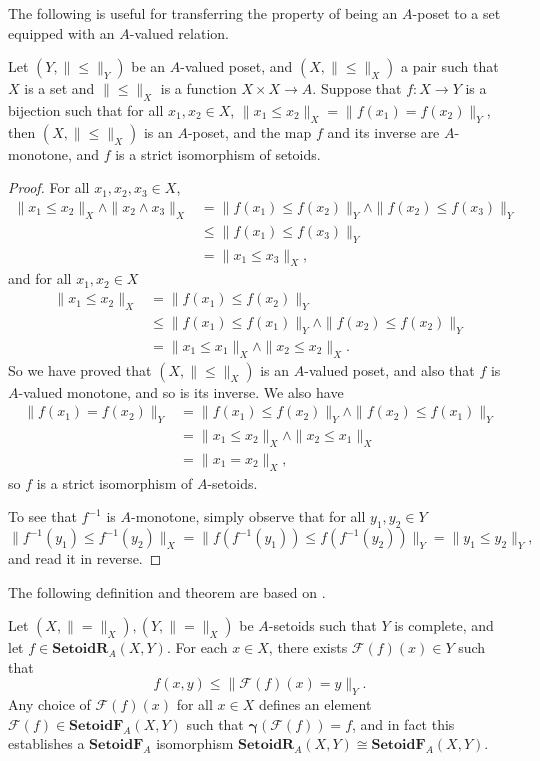 \documentclass{lmcs}
\newcommand{\cat}[1]{\ensuremath{\mathbf{#1}}}
\newcommand{\beq}{\|\mbox{$=$}\|}
\newcommand{\bleq}{\|\mbox{$\leq$}\|}
\newcommand{\graph}{\pmb{\gamma}}
\newcommand{\ungraph}{\pmb{\mathcal{F}}}
\newcommand{\SetoidR}{\cat{SetoidR}}
\newcommand{\SetoidF}{\cat{SetoidF}}
\newcommand{\bvs}[1]{\| {#1} \|}
\begin{document}
The following is useful for transferring the property of being an $A$-poset to a set equipped with an $A$-valued relation.
\begin{lem}
\label{BuildPosetByIsoLemma}
Let $(Y,\bleq_Y)$ be an $A$-valued poset, and $(X,\bleq_X)$ a pair such that $X$ is a set and $\bleq_X$ is a function $X \times X \rightarrow A$. Suppose that $f : X \rightarrow Y$ is a bijection such that for all $x_1,x_2 \in X$, $\bvs{x_1 \leq x_2}_X = \bvs{f(x_1) = f(x_2)}_Y$, then $(X,\bleq_X)$ is an $A$-poset, and the map $f$ and its inverse are $A$-monotone, and $f$ is a strict isomorphism of setoids.
\end{lem}
\begin{proof}
For all $x_1,x_2,x_3 \in X$,
\begin{align*}
\bvs{x_1 \leq x_2}_X \land \bvs{x_2 \land x_3}_X &= \bvs{f(x_1) \leq f(x_2)}_Y \land \bvs{f(x_2) \leq f(x_3)}_Y \\
 &\leq \bvs{f(x_1) \leq f(x_3)}_Y \\
 &= \bvs{x_1 \leq x_3}_X,
\end{align*}
and for all $x_1,x_2 \in X$
\begin{align*}
\bvs{x_1 \leq x_2}_X &= \bvs{f(x_1) \leq f(x_2)}_Y \\
 &\leq \bvs{f(x_1) \leq f(x_1)}_Y \land \bvs{f(x_2) \leq f(x_2)}_Y \\
 &= \bvs{x_1 \leq x_1}_X \land \bvs{x_2 \leq x_2}_X.
\end{align*}
So we have proved that $(X,\bleq_X)$ is an $A$-valued poset, and also that $f$ is $A$-valued monotone, and so is its inverse. We also have
\begin{align*}
\bvs{f(x_1) = f(x_2)}_Y &= \bvs{f(x_1) \leq f(x_2)}_Y \land \bvs{f(x_2) \leq f(x_1)}_Y \\
 &= \bvs{x_1 \leq x_2}_X \land \bvs{x_2 \leq x_1}_X \\
 &= \bvs{x_1 = x_2}_X,
\end{align*}
so $f$ is a strict isomorphism of $A$-setoids. 

To see that $f^{-1}$ is $A$-monotone, simply observe that for all $y_1,y_2 \in Y$
\[
\bvs{f^{-1}(y_1) \leq f^{-1}(y_2)}_X = \bvs{f(f^{-1}(y_1)) \leq f(f^{-1}(y_2))}_Y = \bvs{y_1 \leq y_2}_Y,
\]
and read it in reverse. 
\end{proof}

The following definition and theorem are based on \cite[Proposition 3.3]{monroB}. 
\begin{defi}
	\label{CeilFDef}
	Let $(X,\beq_X), (Y,\beq_X)$ be $A$-setoids such that $Y$ is complete, and let $f \in \SetoidR_A(X,Y)$. For each $x \in X$, there exists $\ungraph(f)(x) \in Y$ such that
	\begin{equation}
		\label{CeilDefiningPropertyEqn}
		f(x,y) \leq \| \ungraph(f)(x) = y \|_Y.
	\end{equation}
	Any choice of $\ungraph(f)(x)$ for all $x \in X$ defines an element $\ungraph(f) \in \SetoidF_A(X,Y)$ such that $\graph(\ungraph(f)) = f$, and in fact this establishes a $\SetoidF_A$ isomorphism $\SetoidR_A(X,Y) \cong \SetoidF_A(X,Y)$. \qedhere
\end{defi}
\end{document}
